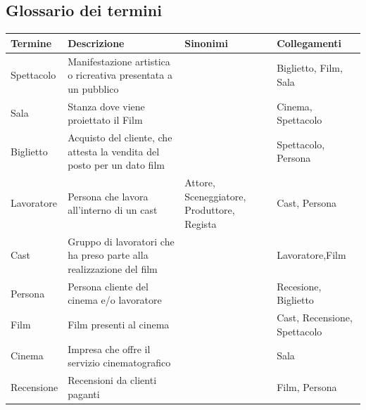 \documentclass[10pt]{article}
\begin{document}
 	\subsection{Glossario dei termini}
 	\begin{tabular}{ |p{3cm}|p{4.5cm}|p{2.5cm}|p{3cm}|  }
 		\hline
 		\rowcolor{lightgray}
 		\textbf{Termine} & \textbf{Descrizione} & \textbf{Sinonimi} & \textbf{Collegamenti} \\
 		\hline
 		Spettacolo                         & Manifestazione artistica o ricreativa presentata a un pubblico               &                                                                                      & Biglietto, Film, Sala                                                             \\ \hline
 		Sala                                   & Stanza dove viene proiettato il Film                                    &                                                                                      & Cinema, Spettacolo \\ \hline
 		Biglietto                              & Acquisto del cliente, che attesta la vendita del posto per un dato film &                                                                                      & Spettacolo, Persona                                                               \\ \hline
 		Lavoratore                                & Persona che lavora all'interno di un cast             & Attore, Sceneggiatore, Produttore, Regista & Cast, Persona                                                                        \\ \hline
 		Cast & Gruppo di lavoratori che ha preso parte alla realizzazione del film &  & Lavoratore,Film \\ \hline 
 		
 		Persona & Persona cliente del cinema e/o lavoratore & & Recesione, Biglietto
 		        \\ \hline
 		Film                                   & Film presenti al cinema                                                 &                                                                                      & Cast, Recensione, Spettacolo       \\ \hline
 		Cinema                                   &    Impresa che offre il servizio cinematografico &                                                                                      &  Sala        \\ \hline
 		Recensione                               & Recensioni da clienti paganti
 		&                                       & Film, Persona \\ \hline
 	\end{tabular}
\end{document}
